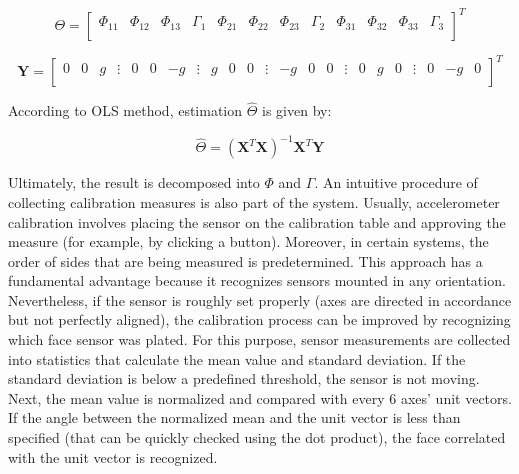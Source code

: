 \begin{equation}
	\bm{\varTheta} = \begin{bmatrix} \varPhi_{11} & \varPhi_{12} & \varPhi_{13} & \varGamma_1 & \varPhi_{21} & \varPhi_{22} & \varPhi_{23} & \varGamma_2 & \varPhi_{31} & \varPhi_{32} & \varPhi_{33} & \varGamma_3 \\
	\end{bmatrix}^T
	\label{ols_theta}
\end{equation}


\begin{equation}
	\bm{Y} = \begin{bmatrix} 0 & 0 & g & \vdots & 0 & 0 & -g & \vdots & g & 0 & 0 & \vdots & -g & 0 & 0  & \vdots& 0 & g & 0 & \vdots & 0 & -g & 0 \\
	\end{bmatrix}^T
	\label{ols_y}
\end{equation}

According to OLS method, estimation $\bm{\hat{\varTheta}}$ is given by:

\begin{equation}
	\bm{\hat{\varTheta}} = \left( \bm{X}^T \bm{X} \right)^{-1} \bm{X}^T \bm{Y}
	\label{ols_est}
\end{equation}

Ultimately, the result is decomposed into $\bm{\varPhi}$ and $\bm{\varGamma}$. An intuitive procedure of collecting calibration measures is also part of the system. Usually, accelerometer calibration involves placing the sensor on the calibration table and approving the measure (for example, by clicking a button). Moreover, in certain systems, the order of sides that are being measured is predetermined. This approach has a fundamental advantage because it recognizes sensors mounted in any orientation. Nevertheless, if the sensor is roughly set properly (axes are directed in accordance but not perfectly aligned), the calibration process can be improved by recognizing which face sensor was plated. For this purpose, sensor measurements are collected into statistics that calculate the mean value and standard deviation. If the standard deviation is below a predefined threshold, the sensor is not moving. Next, the mean value is normalized and compared with every 6 axes’ unit vectors. If the angle between the normalized mean and the unit vector is less than specified (that can be quickly checked using the dot product), the face correlated with the unit vector is recognized.




